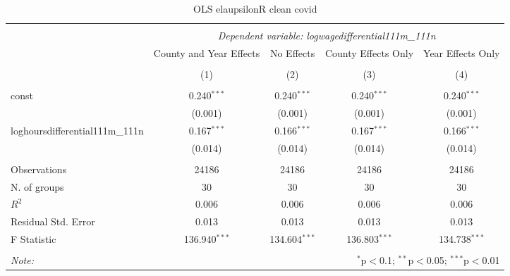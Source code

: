\documentclass{report}
\begin{document}
\begin{table}[!htbp] \centering
  \caption{OLS elaupsilonR clean covid}
\begin{tabular}{@{\extracolsep{5pt}}lcccc}
\\[-1.8ex]\hline
\hline \\[-1.8ex]
& \multicolumn{4}{c}{\textit{Dependent variable: logwagedifferential111m_111n}} \
\cr \cline{2-5}
\\[-1.8ex] & \multicolumn{1}{c}{County and Year Effects} & \multicolumn{1}{c}{No Effects} & \multicolumn{1}{c}{County Effects Only} & \multicolumn{1}{c}{Year Effects Only}  \\
\\[-1.8ex] & (1) & (2) & (3) & (4) \\
\hline \\[-1.8ex]
 const & 0.240$^{***}$ & 0.240$^{***}$ & 0.240$^{***}$ & 0.240$^{***}$ \\
& (0.001) & (0.001) & (0.001) & (0.001) \\
 loghoursdifferential111m_111n & 0.167$^{***}$ & 0.166$^{***}$ & 0.167$^{***}$ & 0.166$^{***}$ \\
& (0.014) & (0.014) & (0.014) & (0.014) \\
\hline \\[-1.8ex]
 Observations & 24186 & 24186 & 24186 & 24186 \\
 N. of groups & 30 & 30 & 30 & 30 \\
 $R^2$ & 0.006 & 0.006 & 0.006 & 0.006 \\
 Residual Std. Error & 0.013 & 0.013 & 0.013 & 0.013 \\
 F Statistic & 136.940$^{***}$ & 134.604$^{***}$ & 136.803$^{***}$ & 134.738$^{***}$ \\
\hline
\hline \\[-1.8ex]
\textit{Note:} & \multicolumn{4}{r}{$^{*}$p$<$0.1; $^{**}$p$<$0.05; $^{***}$p$<$0.01} \\
\end{tabular}
\end{table}
\end{document}
